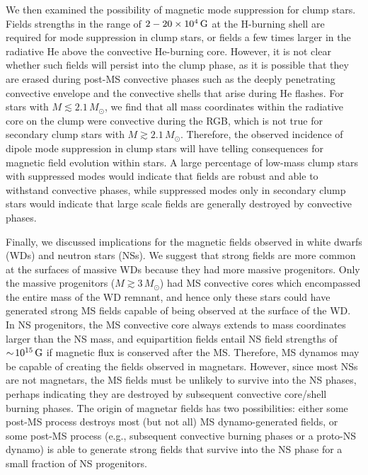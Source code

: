 We then examined the possibility of magnetic mode suppression for clump stars. Fields strengths in the range of $2-20 \times 10^4 \, {\rm G}$ at the H-burning shell are required for mode suppression in clump stars, or fields a few times larger in the radiative He above the convective He-burning core. However, it is not clear whether such fields will persist into the clump phase, as it is possible that they are erased during post-MS convective phases such as the deeply penetrating convective envelope and the convective shells that arise during He flashes. For stars with $M \lesssim 2.1 \, M_\odot$, we find that all mass coordinates within the radiative core on the clump were convective during the RGB, which is not true for secondary clump stars with $M \gtrsim 2.1 \, M_\odot$. Therefore, the observed incidence of dipole mode suppression in clump stars will have telling consequences for magnetic field evolution within stars. A large percentage of low-mass clump stars with suppressed modes would indicate that fields are robust and able to withstand convective phases, while suppressed modes only in secondary clump stars would indicate that large scale fields are generally destroyed by convective phases.

Finally, we discussed implications for the magnetic fields observed in white dwarfs (WDs) and neutron stars (NSs). We suggest that strong fields are more common at the surfaces of massive WDs because they had more massive progenitors. Only the massive progenitors ($M \gtrsim 3 \, M_\odot$) had MS convective cores which encompassed the entire mass of the WD remnant, and hence only these stars could have generated strong MS fields capable of being observed at the surface of the WD. In NS progenitors, the MS convective core always extends to mass coordinates larger than the NS mass, and equipartition fields entail NS field strengths of $\sim \! 10^{15} \, {\rm G}$ if magnetic flux is conserved after the MS. Therefore, MS dynamos may be capable of creating the fields observed in magnetars. However, since most NSs are not magnetars, the MS fields must be unlikely to survive into the NS phases, perhaps indicating they are destroyed by subsequent convective core/shell burning phases. The origin of magnetar fields has two possibilities: either some post-MS process destroys most (but not all) MS dynamo-generated fields, or some post-MS process (e.g., subsequent convective burning phases or a proto-NS dynamo) is able to generate strong fields that survive into the NS phase for a small fraction of NS progenitors.
  
  
  
  
  
  
  
  
  
